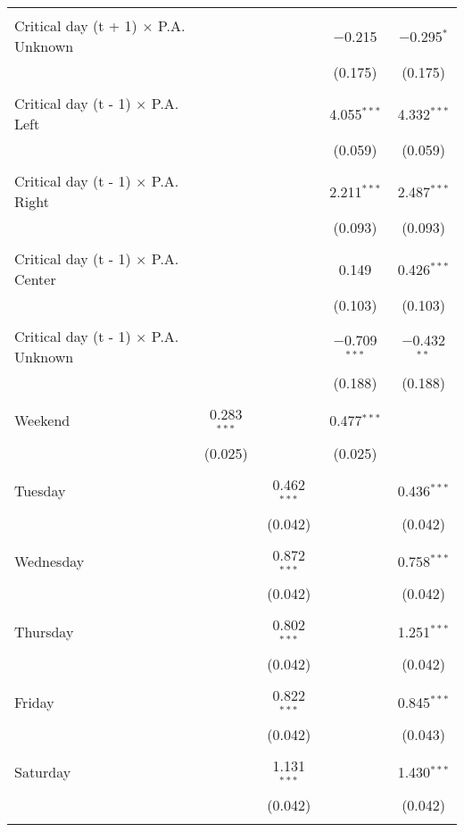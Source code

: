 \documentclass[
]{article}
\begin{document}
\begin{table}[!htbp]
{\begin{tabular}{@{\extracolsep{5pt}}lcccc}
  & & & & \\ 
 Critical day (t + 1) $\times$ P.A. Unknown &  &  & $-$0.215 & $-$0.295$^{*}$ \\ 
  &  &  & (0.175) & (0.175) \\ 
  & & & & \\ 
 Critical day (t - 1) $\times$ P.A. Left &  &  & 4.055$^{***}$ & 4.332$^{***}$ \\ 
  &  &  & (0.059) & (0.059) \\ 
  & & & & \\ 
 Critical day (t - 1) $\times$ P.A. Right &  &  & 2.211$^{***}$ & 2.487$^{***}$ \\ 
  &  &  & (0.093) & (0.093) \\ 
  & & & & \\ 
 Critical day (t - 1) $\times$ P.A. Center &  &  & 0.149 & 0.426$^{***}$ \\ 
  &  &  & (0.103) & (0.103) \\ 
  & & & & \\ 
 Critical day (t - 1) $\times$ P.A. Unknown &  &  & $-$0.709$^{***}$ & $-$0.432$^{**}$ \\ 
  &  &  & (0.188) & (0.188) \\ 
  & & & & \\ 
 Weekend & 0.283$^{***}$ &  & 0.477$^{***}$ &  \\ 
  & (0.025) &  & (0.025) &  \\ 
  & & & & \\ 
 Tuesday &  & 0.462$^{***}$ &  & 0.436$^{***}$ \\ 
  &  & (0.042) &  & (0.042) \\ 
  & & & & \\ 
 Wednesday &  & 0.872$^{***}$ &  & 0.758$^{***}$ \\ 
  &  & (0.042) &  & (0.042) \\ 
  & & & & \\ 
 Thursday &  & 0.802$^{***}$ &  & 1.251$^{***}$ \\ 
  &  & (0.042) &  & (0.042) \\ 
  & & & & \\ 
 Friday &  & 0.822$^{***}$ &  & 0.845$^{***}$ \\ 
  &  & (0.042) &  & (0.043) \\ 
  & & & & \\ 
 Saturday &  & 1.131$^{***}$ &  & 1.430$^{***}$ \\ 
  &  & (0.042) &  & (0.042) \\ 
  & & & & \\ 

\end{tabular}}
\end{table}
\end{document}
